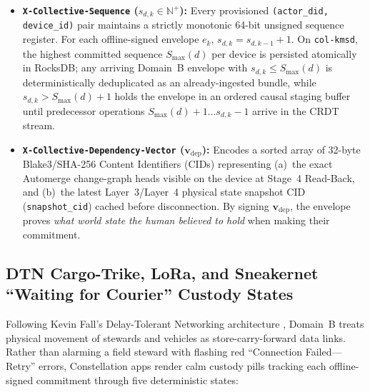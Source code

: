 \begin{itemize}
  \item \textbf{\texttt{X-Collective-Sequence} ($s_{d,k} \in \mathbb{N}^+$):} Every provisioned \texttt{(actor\_did, device\_id)} pair maintains a strictly monotonic 64-bit unsigned sequence register. For each offline-signed envelope $e_k$, $s_{d,k} = s_{d,k-1} + 1$. On \texttt{col-kmsd}, the highest committed sequence $S_{\max}(d)$ per device is persisted atomically in RocksDB; any arriving Domain~B envelope with $s_{d,k} \le S_{\max}(d)$ is deterministically deduplicated as an already-ingested bundle, while $s_{d,k} > S_{\max}(d) + 1$ holds the envelope in an ordered causal staging buffer until predecessor operations $S_{\max}(d)+1 \dots s_{d,k}-1$ arrive in the CRDT stream.
  \item \textbf{\texttt{X-Collective-Dependency-Vector} ($\mathbf{v}_{\mathrm{dep}}$):} Encodes a sorted array of 32-byte Blake3/SHA-256 Content Identifiers (CIDs) representing (a)~the exact Automerge change-graph heads \parencite{kleppmann2017automerge} visible on the device at Stage~4 Read-Back, and (b)~the latest Layer~3/Layer~4 physical state snapshot CID (\texttt{snapshot\_cid}) cached before disconnection. By signing $\mathbf{v}_{\mathrm{dep}}$, the envelope proves \emph{what world state the human believed to hold} when making their commitment.
\end{itemize}

\subsection{DTN Cargo-Trike, LoRa, and Sneakernet ``Waiting for Courier'' Custody States}
\label{subsec:dtn-courier}

Following Kevin Fall's Delay-Tolerant Networking architecture \parencite{fall2003}, Domain~B treats physical movement of stewards and vehicles as store-carry-forward data links. Rather than alarming a field steward with flashing red ``Connection Failed---Retry'' errors, Constellation apps render calm custody pills tracking each offline-signed commitment through five deterministic states:


